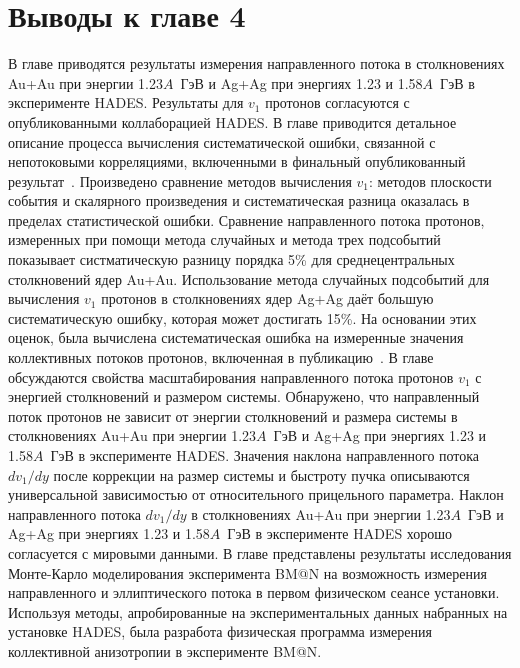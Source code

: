 \section{Выводы к главе 4}
В главе приводятся результаты измерения направленного потока в столкновениях Au+Au при энергии 1.23$A$~ГэВ и Ag+Ag при энергиях 1.23 и 1.58$A$~ГэВ в эксперименте HADES.
Результаты для $v_1$ протонов согласуются с опубликованными коллаборацией HADES.
В главе приводится детальное описание процесса вычисления систематической ошибки, связанной с непотоковыми корреляциями, включенными в финальный опубликованный результат~\cite{HADES:2020lob}.
Произведено сравнение методов вычисления $v_1$: методов плоскости события и скалярного произведения и систематическая разница оказалась в пределах статистической ошибки.
Сравнение направленного потока протонов, измеренных при помощи метода случайных и метода трех подсобытий показывает систматическую разницу порядка 5\% для среднецентральных столкновений ядер Au+Au.
Использование метода случайных подсобытий для вычисления $v_1$ протонов в столкновениях ядер Ag+Ag даёт большую систематическую ошибку, которая может достигать 15\%.
На основании этих оценок, была вычислена систематическая ошибка на измеренные значения коллективных потоков протонов, включенная в публикацию~\cite{HADES:2020lob}.
В главе обсуждаются свойства масштабирования направленного потока протонов $v_1$ с энергией столкновений и размером системы.
Обнаружено, что направленный поток протонов не зависит от энергии столкновений и размера системы в столкновениях Au+Au при энергии 1.23$A$~ГэВ и Ag+Ag при энергиях 1.23 и 1.58$A$~ГэВ в эксперименте HADES.
Значения наклона направленного потока $dv_1/dy$ после коррекции на размер системы и быстроту пучка описываются универсальной зависимостью от относительного прицельного параметра.
Наклон направленного потока $dv_1/dy$ в столкновениях Au+Au при энергии 1.23$A$~ГэВ и Ag+Ag при энергиях 1.23 и 1.58$A$~ГэВ в эксперименте HADES хорошо согласуется с мировыми данными.
В главе представлены результаты исследования Монте-Карло моделирования эксперимента BM@N на возможность измерения направленного и эллиптического потока в первом физическом сеансе установки.
Используя методы, апробированные на экспериментальных данных набранных на установке HADES, была разработа физическая программа измерения коллективной анизотропии в эксперименте BM@N.